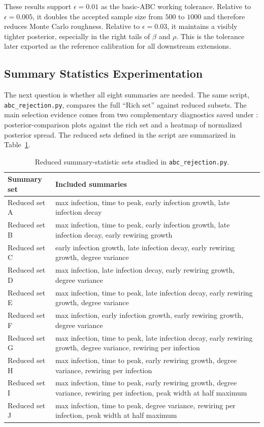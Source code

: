 \documentclass[11pt]{article}
\begin{document}
These results support $\epsilon=0.01$ as the basic-ABC working tolerance. Relative to $\epsilon=0.005$, it doubles the accepted sample size from $500$ to $1000$ and therefore reduces Monte Carlo roughness. Relative to $\epsilon=0.03$, it maintains a visibly tighter posterior, especially in the right tails of $\beta$ and $\rho$. This is the tolerance later exported as the reference calibration for all downstream extensions.

\subsection{Summary Statistics Experimentation}

The next question is whether all eight summaries are needed. The same script, \texttt{abc\_rejection.py}, compares the full ``Rich set'' against reduced subsets. The main selection evidence comes from two complementary diagnostics saved under : posterior-comparison plots against the rich set and a heatmap of normalized posterior spread. The reduced sets defined in the script are summarized in Table~\ref{tab:reduced-sets}.

\begin{table}[H]
\centering
\caption{Reduced summary-statistic sets studied in \texttt{abc\_rejection.py}.}
\label{tab:reduced-sets}
\begin{tabular}{>{\raggedright\arraybackslash}p{} >{\raggedright\arraybackslash}p{}}
\toprule
Summary set & Included summaries \\
\midrule
Reduced set A & max infection, time to peak, early infection growth, late infection decay \\
Reduced set B & max infection, time to peak, early infection growth, late infection decay, early rewiring growth \\
Reduced set C & early infection growth, late infection decay, early rewiring growth, degree variance \\
Reduced set D & max infection, late infection decay, early rewiring growth, degree variance \\
Reduced set E & max infection, time to peak, late infection decay, early rewiring growth, degree variance \\
Reduced set F & max infection, early infection growth, early rewiring growth, degree variance \\
Reduced set G & max infection, time to peak, late infection decay, early rewiring growth, degree variance, rewiring per infection \\
Reduced set H & max infection, time to peak, early rewiring growth, degree variance, rewiring per infection \\
Reduced set I & max infection, time to peak, early rewiring growth, degree variance, rewiring per infection, peak width at half maximum \\
Reduced set J & max infection, time to peak, degree variance, rewiring per infection, peak width at half maximum \\
\bottomrule
\end{tabular}
\end{table}
\end{document}
